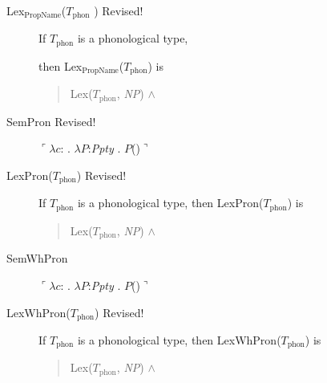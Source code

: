 \begin{description}
\item[\textnormal{Lex$_{\mathrm{PropName}}$($T_{\mathrm{phon}}$
    )} Revised!] \mbox{}

  If $T_{\mathrm{phon}}$ is a phonological type,

  then Lex$_{\mathrm{PropName}}$($T_{\mathrm{phon}}$) is
  \begin{quote}
    Lex($T_{\mathrm{phon}}$, \textit{NP}) \d{$\wedge$}
\end{quote}

\item[\textnormal{SemPron} Revised!] \mbox{}

  $\ulcorner\lambda c$: . $\lambda
  P$:\textit{Ppty}
  . $P$()$\urcorner$

\item[\textnormal{LexPron($T_{\text{phon}}$)} Revised!] \mbox{}

If $T_{\text{phon}}$ is a phonological type, then
LexPron($T_{\text{phon}}$) is
\begin{quote}
Lex($T_{\mathrm{phon}}$, \textit{NP}) \d{$\wedge$}
\end{quote}

\item[\textnormal{SemWhPron}] \mbox{}

  $\ulcorner\lambda c$:
. $\lambda P$:\textit{Ppty}
. $P$()$\urcorner$

\item[\textnormal{LexWhPron($T_{\text{phon}}$)} Revised!] \mbox{}

  If $T_{\text{phon}}$ is a phonological type, then
LexWhPron($T_{\text{phon}}$) is
\begin{quote}
Lex($T_{\mathrm{phon}}$, \textit{NP}) \d{$\wedge$}
\end{quote}


\end{description}
